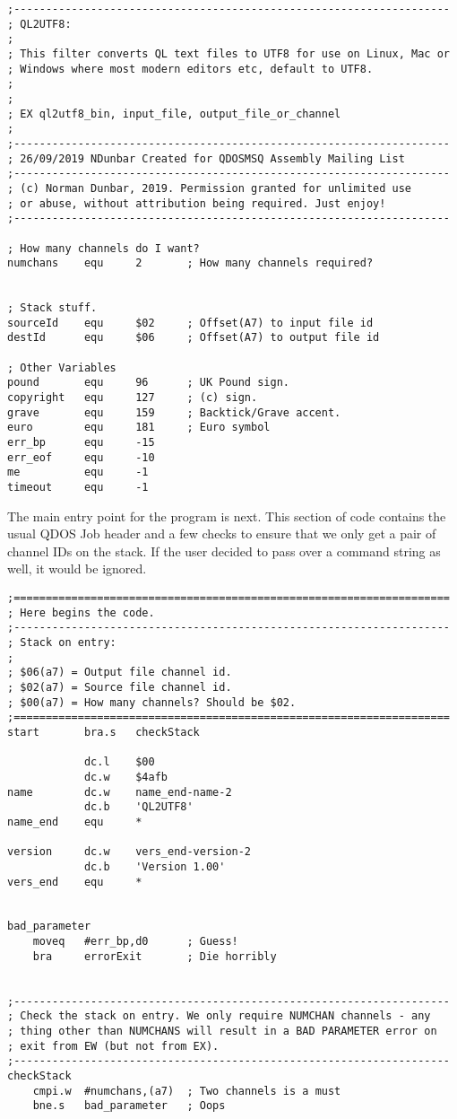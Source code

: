 \begin{lstlisting}[firstnumber=1,caption={Ql2utf8: Introductory comments}]
;--------------------------------------------------------------------
; QL2UTF8:
;
; This filter converts QL text files to UTF8 for use on Linux, Mac or
; Windows where most modern editors etc, default to UTF8.
;
;
; EX ql2utf8_bin, input_file, output_file_or_channel
;
;--------------------------------------------------------------------
; 26/09/2019 NDunbar Created for QDOSMSQ Assembly Mailing List
;--------------------------------------------------------------------
; (c) Norman Dunbar, 2019. Permission granted for unlimited use
; or abuse, without attribution being required. Just enjoy!
;--------------------------------------------------------------------

; How many channels do I want?
numchans    equ     2       ; How many channels required?


; Stack stuff.
sourceId    equ     $02     ; Offset(A7) to input file id
destId      equ     $06     ; Offset(A7) to output file id

; Other Variables
pound       equ     96      ; UK Pound sign.
copyright   equ     127     ; (c) sign.
grave       equ     159     ; Backtick/Grave accent.
euro        equ     181     ; Euro symbol
err_bp      equ     -15
err_eof     equ     -10
me          equ     -1
timeout     equ     -1
\end{lstlisting}

The main entry point for the program is next. This section of code
contains the usual QDOS Job header and a few checks to ensure that
we only get a pair of channel IDs on the stack. If the user decided
to pass over a command string as well, it would be ignored.

\begin{lstlisting}[firstnumber=last,caption={Ql2utf8: Job header and initialisation}]
;====================================================================
; Here begins the code.
;--------------------------------------------------------------------
; Stack on entry:
;
; $06(a7) = Output file channel id.
; $02(a7) = Source file channel id.
; $00(a7) = How many channels? Should be $02.
;====================================================================
start       bra.s   checkStack

            dc.l    $00
            dc.w    $4afb
name        dc.w    name_end-name-2
            dc.b    'QL2UTF8'
name_end    equ     *

version     dc.w    vers_end-version-2
            dc.b    'Version 1.00'
vers_end    equ     *


bad_parameter
    moveq   #err_bp,d0      ; Guess!
    bra     errorExit       ; Die horribly


;--------------------------------------------------------------------
; Check the stack on entry. We only require NUMCHAN channels - any
; thing other than NUMCHANS will result in a BAD PARAMETER error on
; exit from EW (but not from EX).
;--------------------------------------------------------------------
checkStack
    cmpi.w  #numchans,(a7)  ; Two channels is a must
    bne.s   bad_parameter   ; Oops
\end{lstlisting}


